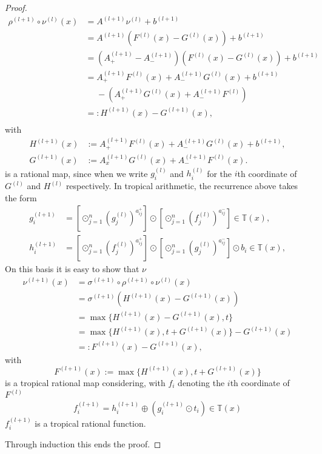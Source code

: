 \documentclass{article}
\theoremstyle{definition}
\begin{document}
\begin{proof}
\begin{align*}
\rho^{(l+1)} \circ \nu^{(l)}(x)
&= A^{(l+1)} \nu^{(l)} + b^{(l+1)} \\
&= A^{(l+1)}(F^{(l)}(x) - G^{(l)}(x)) + b^{(l+1)} \\
&=(A^{(l+1)}_{+} - A^{(l+1)}_{-})(F^{(l)}(x) - G^{(l)}(x)) + b^{(l+1)} \\
&=A_{+}^{(l+1)}F^{(l)}(x) + A_{-}^{(l+1)}G^{(l)}(x) + b^{(l+1)} \\ &\ \ \ \ \ \ -(A_{+}^{(l+1)}G^{(l)}(x) + A_{-}^{(l+1)}F^{(l)})\\
&=: H^{(l+1)}(x) - G^{(l+1)}(x), \\
\end{align*}
with
\begin{align*}
H^{(l+1)}(x) &:= A_{+}^{(l+1)}F^{(l)}(x) + A_{-}^{(l+1)}G^{(l)}(x) + b^{(l+1)}, \\
G^{(l+1)}(x) &:= A_{x}^{(l+1)}G^{(l)}(x) + A_{-}^{(l+1)}F^{(l)}(x).
\end{align*}
is a rational map, since when we write $g_{i}^{(l)}$ and $h_{i}^{(l)}$ for the $i$th coordinate of $G^{(l)}$ and $H^{(l)}$ respectively. In tropical arithmetic, the recurrence above takes the form
\begin{align*}
g_{i}^{(l+1)} &= [\odot^{n}_{j=1}(g_j^{(l)})^{a_{ij}^{+}}] \odot [\odot^{n}_{j=1}(f_j^{(l)})^{a_{ij}^{-}}] \in \mathbb{T}(x), \\
h_{i}^{(l+1)} &= [\odot^{n}_{j=1}(f_j^{(l)})^{a_{ij}^{+}}] \odot [\odot^{n}_{j=1}(g_j^{(l)})^{a_{ij}^{-}}] \odot b_{i} \in \mathbb{T}(x),
\end{align*}
On this basis it is easy to show that $\nu$
\begin{align*}
\nu^{(l+1)}(x) 
&= \sigma^{(l+1)} \circ \rho^{(l+1)} \circ \nu^{(l)}(x) \\
&= \sigma^{(l+1)} (H^{(l+1)}(x) - G^{(l+1)}(x)) \\
&= \max\{ H^{(l+1)}(x) - G^{(l+1)}(x), t\} \\
&= \max\{ H^{(l+1)}(x), t + G^{(l+1)}(x)\} - G^{(l+1)}(x) \\
&=: F^{(l+1)}(x) - G^{(l+1)}(x),
\end{align*}
with
$$F^{(l+1)}(x) := \max\{ H^{(l+1)}(x), t + G^{(l+1)}(x)\}$$
is a tropical rational map considering, with $f_{i}$ denoting the $i$th coordinate of $F^{(l)}$
$$f_{i}^{(l+1)} = h_{i}^{(l+1)} \oplus (g_{i}^{(l+1)} \odot t_{i}) \in \mathbb{T}(x)$$
$f_{i}^{(l+1)}$ is a tropical rational function.

Through induction this ends the proof.
\end{proof}
\end{document}
